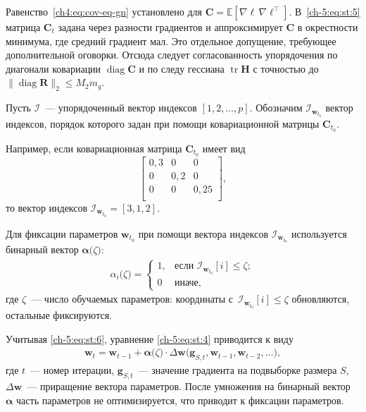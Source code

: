 \begin{remark}\label{ch4:rem:cov-Ct}
Равенство~\eqref{ch4:eq:cov-eq-gn} установлено для $\mathbf{C}=\mathbb{E}[\nabla\ell\,\nabla\ell^{\top}]$.
В~\eqref{ch-5:eq:st:5} матрица $\mathbf{C}_t$ задана через разности градиентов и аппроксимирует $\mathbf{C}$ в окрестности минимума, где средний градиент мал.
Это отдельное допущение, требующее дополнительной оговорки.
Отсюда следует согласованность упорядочения по диагонали ковариации $\operatorname{diag}\mathbf{C}$ и по следу гессиана $\operatorname{tr}\mathbf{H}$ с точностью до $\lVert\operatorname{diag}\mathbf{R}\rVert_2\le M_2m_g$.
\end{remark}

Пусть $\mathcal{I}$~---  упорядоченный вектор индексов $[1, 2, \ldots, p]$. Обозначим $\mathcal{I}_{\textbf{w}_{t_0}}$ вектор индексов, порядок которого задан при помощи ковариационной матрицы $\mathbf{C}_{t_0}$.

Например, если ковариационная матрица $\mathbf{C}_{t_0}$  имеет вид
$$
    \begin{bmatrix}
    0{,}3& 0 & 0\\
    0& 0{,}2 & 0\\
    0& 0 & 0{,}25\\
    \end{bmatrix},
$$
 то вектор индексов $\mathcal{I}_{\textbf{w}_{t_0}} = [3,1,2]$.

Для фиксации параметров $\textbf{w}_{t_0}$ при помощи вектора индексов $\mathcal{I}_{\textbf{w}_{t_0}}$ используется бинарный вектор $\bm{\alpha}\bigl(\zeta\bigr)$:
\begin{equation}
    \label{ch-5:eq:st:6}
    \begin{aligned}
    \alpha_i\bigl(\zeta\bigr) = \begin{cases}
       1, &\text{если }\mathcal{I}_{\textbf{w}_{t_0}}[i] \leq \zeta;\\
       0 &\text{иначе},
     \end{cases}
    \end{aligned}
\end{equation}
 где $\zeta$~--- число обучаемых параметров: координаты с~$\mathcal{I}_{\textbf{w}_{t_0}}[i]\le\zeta$ обновляются, остальные фиксируются.

 Учитывая \eqref{ch-5:eq:st:6}, уравнение \eqref{ch-5:eq:st:4} приводится к виду
\[
    \label{ch-5:eq:st:7}
    \begin{aligned}
    \textbf{w}_{t} = \textbf{w}_{t-1} + \bm{\alpha}\bigl(\zeta\bigr)\cdot\Delta\textbf{w}\bigl(\textbf{g}_{S,t}, \textbf{w}_{t-1}, \textbf{w}_{t-2}, \ldots\bigr),
    \end{aligned}
\]
где $t$~--- номер итерации, $\textbf{g}_{S,t}$~--- значение градиента на подвыборке размера $S$, $\Delta\textbf{w}$~--- приращение вектора параметров. После умножения на бинарный вектор $\bm\alpha$ часть параметров не оптимизируется, что приводит к фиксации параметров.

